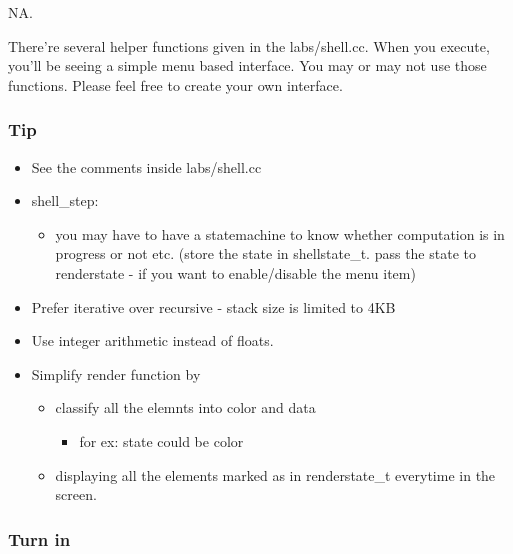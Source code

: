 \documentclass[]{book}
\begin{document}
NA.

There're several helper functions given in the labs/shell.cc. When you
execute, you'll be seeing a simple menu based interface. You may or may
not use those functions. Please feel free to create your own interface.

\subsubsection*{Tip}\label{tip-3}

\begin{itemize}
\item
  See the comments inside labs/shell.cc
\item
  shell\_step:

  \begin{itemize}
  \itemsep1pt\parskip0pt
  \item
    you may have to have a statemachine to know whether computation is
    in progress or not etc. (store the state in shellstate\_t. pass the
    state to renderstate - if you want to enable/disable the menu item)
  \end{itemize}
\item
  Prefer iterative over recursive - stack size is limited to 4KB
\item
  Use integer arithmetic instead of floats.
\item
  Simplify render function by

  \begin{itemize}
  \itemsep1pt\parskip0pt
  \item
    classify all the elemnts into color and data

    \begin{itemize}
    \itemsep1pt\parskip0pt
    \item
      for ex: state could be color
    \end{itemize}
  \item
    displaying all the elements marked as in renderstate\_t everytime in
    the screen.
  \end{itemize}
\end{itemize}

\subsubsection*{Turn in}\label{turn-in-3}
\end{document}
